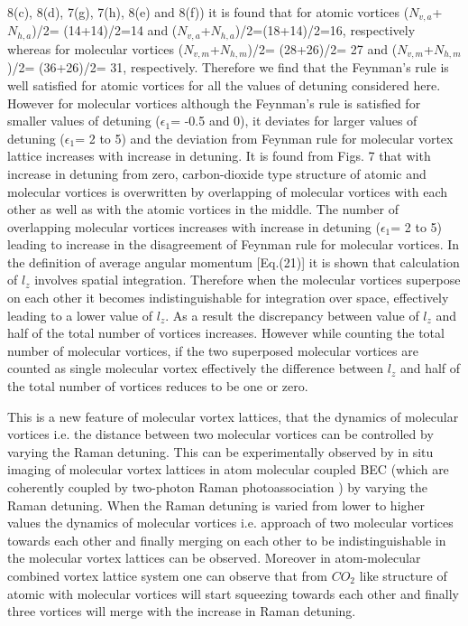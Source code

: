 \documentclass[10pt,a4paper]{article}
\begin{document}
8(c), 8(d), 7(g), 7(h), 8(e) and 8(f)) it is found that for atomic vortices ($N_{v,a}$+$N_{h,a}$)/2= 
(14+14)/2=14 and ($N_{v,a}$+$N_{h,a}$)/2=(18+14)/2=16, respectively whereas for molecular vortices 
($N_{v,m}$+$N_{h,m}$)/2= (28+26)/2= 27 and ($N_{v,m}$+$N_{h,m}$)/2= (36+26)/2= 31, respectively. 
Therefore we find that the Feynman's rule is well satisfied for atomic vortices for all the values of 
detuning considered here. However for molecular vortices although the Feynman's rule is satisfied for 
smaller values of detuning ($\epsilon_1$= -0.5 and 0), it deviates for larger values of detuning 
($\epsilon_1$= 2 to 5) and the deviation from Feynman rule for molecular vortex lattice increases with increase in detuning.
It is found from Figs. 7 that
with increase in detuning from zero, carbon-dioxide type structure
of atomic and molecular vortices is overwritten by overlapping of
molecular vortices with each other as well as with the atomic
vortices in the middle. The number of overlapping molecular
vortices increases with increase in detuning ($\epsilon_1$= 2 to 5)
leading to increase in the disagreement of Feynman rule for
molecular vortices. In the definition of average angular momentum
[Eq.(21)] it is shown that calculation of $l_z$ involves spatial
integration. Therefore when the molecular vortices superpose on
each other it becomes indistinguishable for integration over
space, effectively leading to a lower value of $l_z$. As a result
the discrepancy between value of $l_z$ and half of the total
number of vortices increases. However while counting the total
number of molecular vortices, if the two superposed molecular
vortices are counted as single molecular vortex effectively the
difference between $l_z$ and half of the total number of vortices
reduces to be one or zero. 

 This is a new feature of molecular vortex lattices, that the
dynamics of molecular vortices i.e. the distance between
two molecular vortices can be controlled by varying the
Raman detuning. This can be experimentally observed by in situ imaging \cite{Wilson} 
of molecular vortex lattices in atom molecular coupled BEC (which are coherently 
coupled by two-photon Raman photoassociation \cite{Donley}) by varying the 
Raman detuning. When the Raman detuning is varied
from lower to higher values the dynamics of molecular
vortices i.e. approach of two molecular vortices towards
each other and finally merging on each other to be
indistinguishable in the molecular vortex lattices can be
observed. Moreover in atom-molecular combined vortex lattice system 
one can observe that from $CO_2$ like structure of atomic with molecular vortices will 
start squeezing towards each other and finally three vortices will merge with the increase 
in Raman detuning.
\end{document}
